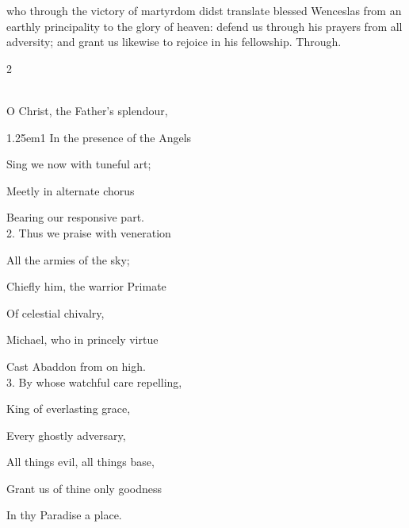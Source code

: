 
\memorialCollect
{} who through the victory of martyrdom didst translate blessed Wenceslas from an earthly principality to the glory of heaven: defend us through his prayers from all adversity; and grant us likewise to rejoice in his fellowship. Through.


\label{Michaelmas}


\begin{paracol}{2}
\sloppy

\firstEvensong
{}\\%

\firstEvensongHymn
{} O Christ, the Father's splendour,


\begin{hangparas}{1.25em}{1}
In the presence of the Angels

Sing we now with tuneful art;

Meetly in alternate chorus

Bearing our responsive part.\\

2. Thus we praise with veneration

All the armies of the sky;

Chiefly him, the warrior Primate

Of celestial chivalry,

Michael, who in princely virtue

Cast Abaddon from on high.\\

3. By whose watchful care repelling,

King of everlasting grace,

Every ghostly adversary,

All things evil, all things base,

Grant us of thine only goodness

In thy Paradise a place.\\


\end{hangparas}
\end{paracol}
